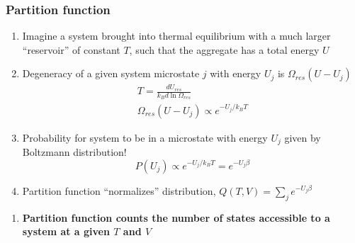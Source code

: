 \documentclass[11pt]{article}
\begin{document}
\subsubsection{Partition function}
\label{sec:org58f4494}
\begin{enumerate}
\item Imagine a system brought into thermal equilibrium with a much larger ``reservoir'' of constant \(T\), such that the aggregate has a total energy \(U\)
\item Degeneracy of a given system microstate \(j\) with energy \(U_j\) is \(\Omega_{res}(U-U_j)\)
\begin{eqnarray*}
  T = \frac{dU_{res}}{k_Bd\ln\Omega_{res}} \\
  \Omega_{res}(U-U_j) \propto e^{-U_j/k_B T}
\end{eqnarray*}
\item Probability for system to be in a microstate with energy \(U_j\) given by Boltzmann distribution!
\begin{displaymath}
  P(U_j) \propto e^{-U_j/k_B T} = e^{-U_j \beta}
\end{displaymath}
\item Partition function ``normalizes'' distribution, \(Q(T,V) = \sum_j e^{-U_j \beta}\)
\end{enumerate}

\begin{enumerate}
\item \textbf{Partition function counts the number of states accessible to a system at a given \(T\) and \(V\)}
\end{enumerate}
\end{document}
